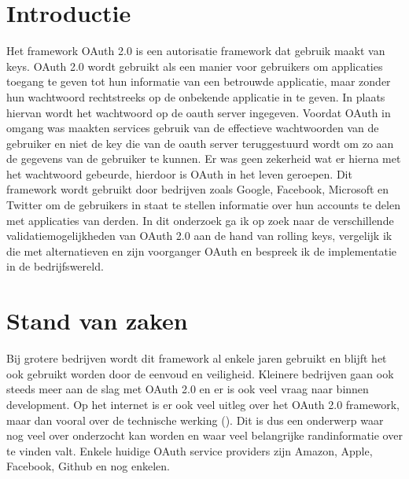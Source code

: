
\section{Introductie} %
\label{sec:introductie}

Het framework OAuth 2.0 is een autorisatie framework dat gebruik maakt van keys. OAuth 2.0 wordt gebruikt als een manier voor gebruikers om applicaties toegang te geven tot hun informatie van een betrouwde applicatie, maar zonder hun wachtwoord rechtstreeks op de onbekende applicatie in te geven. In plaats hiervan wordt het wachtwoord op de oauth server ingegeven. Voordat OAuth in omgang was maakten services gebruik van de effectieve wachtwoorden van de gebruiker en niet de key die van de oauth server teruggestuurd wordt om zo aan de gegevens van de gebruiker te kunnen. Er was geen zekerheid wat er hierna met het wachtwoord gebeurde, hierdoor is OAuth in het leven geroepen. Dit framework wordt gebruikt door bedrijven zoals Google, Facebook, Microsoft en Twitter om de gebruikers in staat te stellen informatie over hun accounts te delen met applicaties van derden.\newline\newline
In dit onderzoek ga ik op zoek naar de verschillende validatiemogelijkheden van OAuth 2.0 aan de hand van rolling keys, vergelijk ik die met alternatieven en zijn voorganger OAuth en bespreek ik de implementatie in de bedrijfswereld.


\section{Stand van zaken}
\label{sec:state-of-the-art}

Bij grotere bedrijven wordt dit framework al enkele jaren gebruikt en blijft het ook gebruikt worden door de eenvoud en veiligheid. Kleinere bedrijven gaan ook steeds meer aan de slag met OAuth 2.0 en er is ook veel vraag naar binnen development. Op het internet is er ook veel uitleg over het OAuth 2.0 framework, maar dan vooral over de technische werking (\cite{Deniss2016}). \newline\newline
Dit is dus een onderwerp waar nog veel over onderzocht kan worden en waar veel belangrijke randinformatie over te vinden valt. Enkele huidige OAuth service providers zijn Amazon, Apple, Facebook, Github en nog enkelen.

